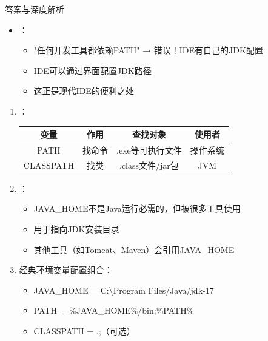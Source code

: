 \documentclass[12pt, a4paper]{ctexart}
\begin{document}
\begin{enumerate}[label=\textbf{\arabic*.}]
\begin{bluebox}{答案与深度解析}
\begin{itemize}[leftmargin=*, nosep]
			      \item {}：
			            \begin{itemize}
				            \item "任何开发工具都依赖PATH" → 错误！IDE有自己的JDK配置
				            \item IDE可以通过界面配置JDK路径
				            \item 这正是现代IDE的便利之处
			            \end{itemize}
		      \end{itemize}

		      \begin{enumerate}[leftmargin=*, nosep]
			      \item {}：
			            \begin{tabular}{|c|c|c|c|}
				            \hline
				            \textbf{变量} & \textbf{作用} & \textbf{查找对象} & \textbf{使用者} \\
				            \hline
				            PATH        & 找命令         & .exe等可执行文件    & 操作系统         \\
				            \hline
				            CLASSPATH   & 找类          & .class文件/jar包 & JVM          \\
				            \hline
			            \end{tabular}

			      \item {}：
			            \begin{itemize}
				            \item JAVA\_HOME不是Java运行必需的，但被很多工具使用
				            \item 用于指向JDK安装目录
				            \item 其他工具（如Tomcat、Maven）会引用JAVA\_HOME
			            \end{itemize}

			      \item 经典环境变量配置组合：
			            \begin{itemize}
				            \item {JAVA\_HOME = C:\textbackslash Program Files/Java/jdk-17}
				            \item {PATH = \%JAVA\_HOME\%/bin;\%PATH\%}
				            \item {CLASSPATH = .;（可选）}
			            \end{itemize}


\end{enumerate}
\end{bluebox}
\end{enumerate}
\end{document}

